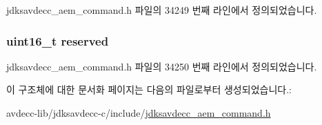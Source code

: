 jdksavdecc\+\_\+aem\+\_\+command.\+h 파일의 34249 번째 라인에서 정의되었습니다.

\subsubsection[{\texorpdfstring{reserved}{reserved}}]{\setlength{\rightskip}{0pt plus 5cm}uint16\+\_\+t reserved}\hypertarget{structjdksavdecc__aem__command__abort__operation_a5a6ed8c04a3db86066924b1a1bf4dad3}{}\label{structjdksavdecc__aem__command__abort__operation_a5a6ed8c04a3db86066924b1a1bf4dad3}


jdksavdecc\+\_\+aem\+\_\+command.\+h 파일의 34250 번째 라인에서 정의되었습니다.



이 구조체에 대한 문서화 페이지는 다음의 파일로부터 생성되었습니다.\+:\begin{DoxyCompactItemize}
\item 
avdecc-\/lib/jdksavdecc-\/c/include/\hyperlink{jdksavdecc__aem__command_8h}{jdksavdecc\+\_\+aem\+\_\+command.\+h}\end{DoxyCompactItemize}
